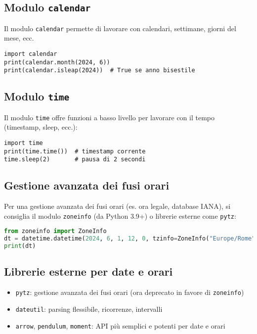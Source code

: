 \documentclass[a4paper,12pt]{article}
\begin{document}
\subsection*{Modulo \texttt{calendar}}
Il modulo \texttt{calendar} permette di lavorare con calendari, settimane, giorni del mese, ecc.
\begin{lstlisting}
import calendar
print(calendar.month(2024, 6))
print(calendar.isleap(2024))  # True se anno bisestile
\end{lstlisting}

\subsection*{Modulo \texttt{time}}
Il modulo \texttt{time} offre funzioni a basso livello per lavorare con il tempo (timestamp, sleep, ecc.):
\begin{lstlisting}
import time
print(time.time())  # timestamp corrente
time.sleep(2)       # pausa di 2 secondi
\end{lstlisting}

\subsection*{Gestione avanzata dei fusi orari}
Per una gestione avanzata dei fusi orari (es. ora legale, database IANA), si consiglia il modulo \texttt{zoneinfo} (da Python 3.9+) o librerie esterne come \texttt{pytz}:
\begin{lstlisting}[language=Python, basicstyle=\ttfamily\footnotesize, breaklines=true, frame=single]
from zoneinfo import ZoneInfo
dt = datetime.datetime(2024, 6, 1, 12, 0, tzinfo=ZoneInfo("Europe/Rome"))
print(dt)
\end{lstlisting}

\subsection*{Librerie esterne per date e orari}
\begin{itemize}
    \item \texttt{pytz}: gestione avanzata dei fusi orari (ora deprecato in favore di \texttt{zoneinfo})
    \item \texttt{dateutil}: parsing flessibile, ricorrenze, intervalli
    \item \texttt{arrow}, \texttt{pendulum}, \texttt{moment}: API più semplici e potenti per date e orari
\end{itemize}
\end{document}
